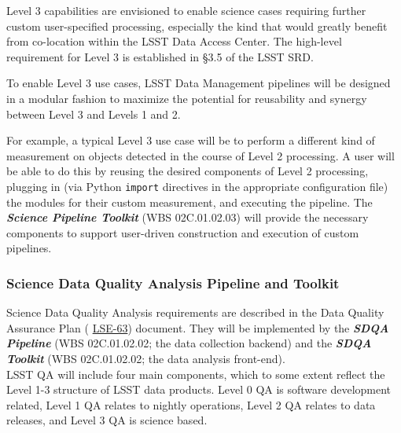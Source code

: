 \documentclass[12pt]{article}
\newcommand{\ds}[2]{{\color{blue} \href{https://docushare.lsstcorp.org/docushare/dsweb/Get/#1}{#2}}\xspace}
\newcommand{\SDQAP}{\ds{LSE-63}{LSE-63}}
\newcommand{\wbsSDQAP}{WBS 02C.01.02.02}
\newcommand{\wbsSDQAT}{WBS 02C.01.02.02}
\newcommand{\wbsSPT}{WBS 02C.01.02.03}
\begin{document}
Level 3 capabilities are envisioned to enable science cases requiring further custom user-specified processing, especially the kind that would greatly benefit from co-location within the LSST Data Access Center. The high-level requirement for Level 3 is established in \S 3.5 of the LSST SRD.

To enable Level 3 use cases, LSST Data Management pipelines will be designed in a modular fashion to maximize the potential for reusability and synergy between Level 3 and Levels 1 and 2.

For example, a typical Level 3 use case will be to perform a different kind of measurement on objects detected in the course of Level 2 processing. A user will be able to do this by reusing the desired components of Level 2 processing, plugging in (via Python {\tt import} directives in the appropriate configuration file) the modules for their custom measurement, and executing the pipeline. The {\bf \em Science Pipeline Toolkit} (\wbsSPT) will provide the necessary components to support user-driven construction and execution of custom pipelines.

\subsubsection{Science Data Quality Analysis Pipeline and Toolkit}

Science Data Quality Analysis requirements are described in the Data Quality Assurance Plan (\SDQAP) document. They will be implemented by the {\bf \em SDQA Pipeline} (\wbsSDQAP; the data collection backend) and the {\bf \em SDQA Toolkit} (\wbsSDQAT; the data analysis front-end).
\\

LSST QA will include four main components, which to some extent reflect the Level 1-3 structure of LSST data products. Level 0 QA is software development related, Level 1 QA relates to nightly operations, Level 2 QA relates to data releases, and Level 3 QA is science based.
\end{document}
